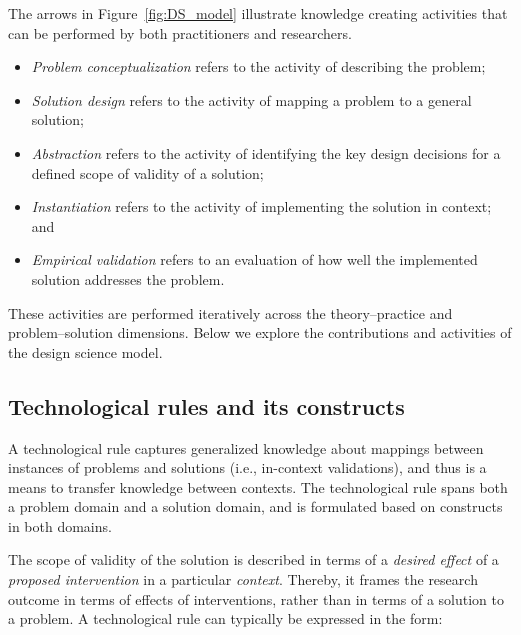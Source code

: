 \documentclass[graybox]{svmult}
\newcommand{\peggy}[1]{\textcolor{blue}{{\it [Peggy says: #1]}}}
\newcommand{\per}[1]{\textcolor{cyan}{{\it [Per says: #1]}}}
\newcommand{\peggy}[1]{}
\newcommand{\per}[1]{}
\begin{document}
The arrows in Figure~\ref{fig:DS_model} illustrate knowledge creating activities that can be performed by both practitioners and researchers. 
\begin{itemize}
\item \emph{Problem conceptualization} refers to the activity of describing the problem; %
\item \emph{Solution design} refers to the activity of mapping a problem to a general solution; 
\item \emph{Abstraction} refers to the activity of identifying the key design decisions for a defined scope of validity of a solution; 
\item \emph{Instantiation} refers to the activity of implementing the solution in context; and 
\item \emph{Empirical validation} refers to an evaluation of how well the implemented solution addresses the problem.
\end{itemize}

These activities are performed iteratively across the theory--practice and problem--solution dimensions. Below we explore the contributions and activities of the design science model. 

\subsection{Technological rules and its constructs}
\label{sec:technologicalrules}


A technological rule captures generalized knowledge about mappings between instances of problems and solutions (i.e., in-context validations), and thus is a means to transfer knowledge between contexts. The technological rule spans both a problem domain and a solution domain, and is formulated based on constructs in both domains. 

The scope of validity of the solution is described in terms of a  \emph{desired effect} of a \emph{proposed intervention} in a particular \emph{context}. Thereby, it frames the research outcome in terms of effects of interventions, rather than in terms of a solution to a problem. A technological rule can typically be expressed in the form: 
\end{document}
